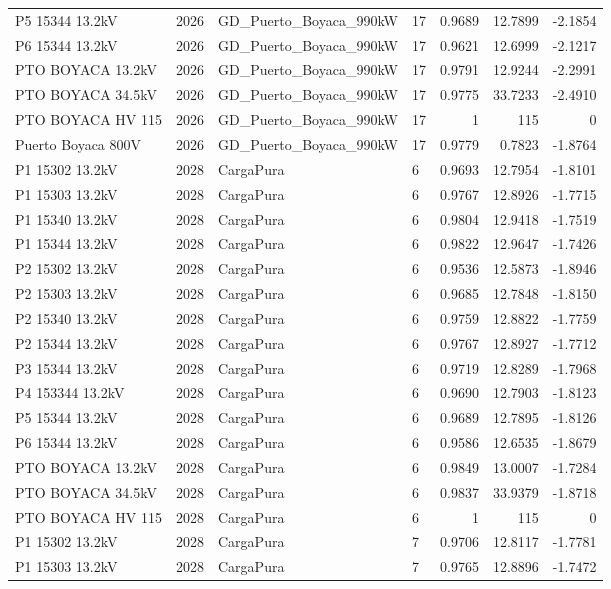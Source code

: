 \documentclass[11pt,a4paper]{article}
\begin{document}
\begin{longtable}{llllrrr}
P5 15344 13.2kV & 2026 & GD\_Puerto\_Boyaca\_990kW & 17 & 0.9689 & 12.7899 & -2.1854 \\
P6 15344 13.2kV & 2026 & GD\_Puerto\_Boyaca\_990kW & 17 & 0.9621 & 12.6999 & -2.1217 \\
PTO BOYACA 13.2kV & 2026 & GD\_Puerto\_Boyaca\_990kW & 17 & 0.9791 & 12.9244 & -2.2991 \\
PTO BOYACA 34.5kV & 2026 & GD\_Puerto\_Boyaca\_990kW & 17 & 0.9775 & 33.7233 & -2.4910 \\
PTO BOYACA HV 115 & 2026 & GD\_Puerto\_Boyaca\_990kW & 17 & 1 & 115 & 0 \\
Puerto Boyaca 800V & 2026 & GD\_Puerto\_Boyaca\_990kW & 17 & 0.9779 & 0.7823 & -1.8764 \\
P1 15302 13.2kV & 2028 & CargaPura & 6 & 0.9693 & 12.7954 & -1.8101 \\
P1 15303 13.2kV & 2028 & CargaPura & 6 & 0.9767 & 12.8926 & -1.7715 \\
P1 15340 13.2kV & 2028 & CargaPura & 6 & 0.9804 & 12.9418 & -1.7519 \\
P1 15344 13.2kV & 2028 & CargaPura & 6 & 0.9822 & 12.9647 & -1.7426 \\
P2 15302 13.2kV & 2028 & CargaPura & 6 & 0.9536 & 12.5873 & -1.8946 \\
P2 15303 13.2kV & 2028 & CargaPura & 6 & 0.9685 & 12.7848 & -1.8150 \\
P2 15340 13.2kV & 2028 & CargaPura & 6 & 0.9759 & 12.8822 & -1.7759 \\
P2 15344 13.2kV & 2028 & CargaPura & 6 & 0.9767 & 12.8927 & -1.7712 \\
P3 15344 13.2kV & 2028 & CargaPura & 6 & 0.9719 & 12.8289 & -1.7968 \\
P4 153344 13.2kV & 2028 & CargaPura & 6 & 0.9690 & 12.7903 & -1.8123 \\
P5 15344 13.2kV & 2028 & CargaPura & 6 & 0.9689 & 12.7895 & -1.8126 \\
P6 15344 13.2kV & 2028 & CargaPura & 6 & 0.9586 & 12.6535 & -1.8679 \\
PTO BOYACA 13.2kV & 2028 & CargaPura & 6 & 0.9849 & 13.0007 & -1.7284 \\
PTO BOYACA 34.5kV & 2028 & CargaPura & 6 & 0.9837 & 33.9379 & -1.8718 \\
PTO BOYACA HV 115 & 2028 & CargaPura & 6 & 1 & 115 & 0 \\
P1 15302 13.2kV & 2028 & CargaPura & 7 & 0.9706 & 12.8117 & -1.7781 \\
P1 15303 13.2kV & 2028 & CargaPura & 7 & 0.9765 & 12.8896 & -1.7472 \\

\end{longtable}
\end{document}
